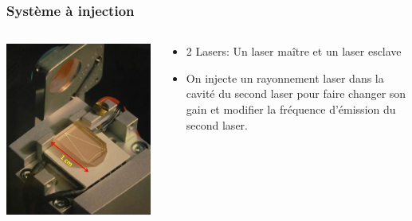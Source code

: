 \documentclass{beamer}
\begin{document}
\begin{frame}
	\frametitle{Système à injection}
	\begin{columns}
		\begin{column}{0.5\textwidth}
			\includegraphics[width=\textwidth]{Docs/NPRO.png}
		\end{column}
			

		\begin{column}{0.5\textwidth}
				\begin{itemize}
					\item 2 Lasers: Un laser maître et un laser esclave
					\item On injecte un rayonnement laser dans la cavité du second laser pour faire changer son gain et modifier la fréquence d'émission du second laser.
				\end{itemize}
		\end{column}
	\end{columns}
\end{frame}
\end{document}
